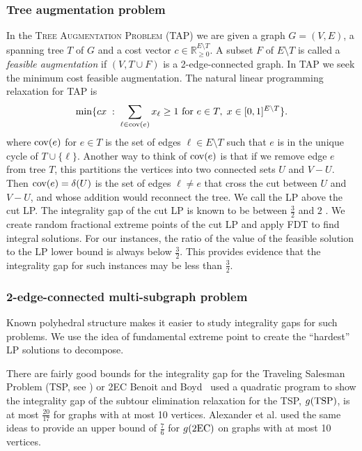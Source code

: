 \subsubsection{Tree augmentation problem}
In the \textsc{Tree Augmentation Problem (TAP)} we are given a  graph $G=(V,E)$, a spanning tree $T$ of $G$ and a cost vector $c\in \mathbb{R}^{E\setminus T}_{\geq 0}$. A subset $F$ of $E\setminus T$ is called a \textit{feasible augmentation} if $(V,T\cup F)$ is a 2-edge-connected graph. In TAP we seek the minimum cost feasible augmentation. The natural linear programming relaxation for TAP is 
\begin{equation}
\min \{cx\; : \; \sum_{\ell \in \mathrm{cov}(e)} x_{\ell} \geq 1 \text{ for } e\in T, \; x\in [0,1]^{E\setminus T}\}.
\end{equation}
where $\mathrm{cov}(e)$ for $e \in T$ is the set of edges $\ell \in E\setminus T$ such that $e$ is in the unique cycle of $T\cup \{\ell\}$. Another way to think of $\mathrm{cov}(e)$ is that if we remove edge $e$ from tree $T$, this partitions the vertices into two connected sets $U$ and $V-U$.  Then $\mathrm{cov}(e) = \delta(U)$ is the set of edges $\ell \neq e$ that cross the cut between $U$ and $V-U$, and whose addition would reconnect the tree. We call the LP above the cut LP. The integrality gap of the cut LP is known to be between $\frac{3}{2}$ \cite{32gaptap} and $2$ \cite{FJ81}. We create random fractional extreme points of the cut LP and apply FDT to find integral solutions. For our instances, the ratio of the value of the feasible solution to the LP lower bound is always below $\frac{3}{2}$. This provides evidence that the integrality gap for such instances may be less than $\frac{3}{2}$.

\subsubsection{2-edge-connected multi-subgraph problem}
Known polyhedral structure makes it easier to study integrality gaps for such problems. We use the idea of fundamental extreme point \cite{carrravi,boydcarr,Carr2004} to create the ``hardest'' LP solutions to decompose.

There are fairly good bounds for the integrality gap for the Traveling Salesman Problem (TSP, see \cite{tspbook}) or 2EC 
Benoit and Boyd~\cite{TSPcompute} used a quadratic program to show the integrality gap of the subtour elimination relaxation for the TSP, $g(\operatorname{{{TSP}}})$, is at most $\frac{20}{17}$ for graphs with at most 10 vertices. Alexander et al. \cite{alexander2006integrality} used the same ideas to provide an upper bound of $\frac{7}{6}$ for $g(\2ec)$ on graphs with at most 10 vertices. 

